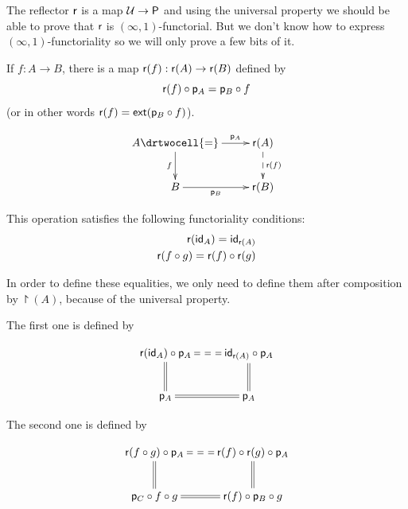 The reflector $\reflect$ is a map $\type\to\P$ and using the universal property
we should be able to prove that $\reflect$ is $(\infty,1)$-functorial. But we
don't know how to express $(\infty,1)$-functoriality so we will only prove a
few bits of it.

\begin{defn}
  If $f:A\to{}B$, there is a map $\reflect(f):\reflect(A)\to\reflect(B)$ defined
  by
  \[\reflect(f)\circ\project_A=\project_B\circ{}f\]
  (or in other words $\reflect(f)=\ext(\project_B\circ{}f)$).

  \[\uppercurveobject{{ }}\lowercurveobject{{ }}\twocellhead{{ }}
  \xymatrix{A \ar^-{\project_A}[r] \ar_-f[d] \drtwocell{=} & \reflect(A)
    \ar@{-->}^-{\reflect(f)}[d]
    \\ B \ar_-{\project_B}[r] & \reflect(B)}\]

  This operation satisfies the following functoriality conditions:
  \begin{align*}
    \reflect(\idfunc[A])=\idfunc[\reflect(A)]\\
    \reflect(f\circ{}g)=\reflect(f)\circ\reflect(g)
  \end{align*}

  In order to define these equalities, we only need to define them after
  composition by $\project(A)$, because of the universal property.

  The first one is defined by

  \[\xymatrix{
    \reflect(\idfunc[A])\circ\project_A \ar@{==}[r] \ar@{=}[d] &
    \idfunc[\reflect(A)]\circ\project_A \ar@{=}[d] \\
    \project_A \ar@{=}[r] & \project_A
  }\]

  The second one is defined by

  \[\xymatrix{
    \reflect(f\circ g)\circ\project_A \ar@{==}[r] \ar@{=}[d] &
    \reflect(f)\circ\reflect(g)\circ\project_A \ar@{=}[d] \\
    \project_C\circ f\circ g \ar@{=}[r] & \reflect(f)\circ\project_B\circ g
  }\]
\end{defn}



